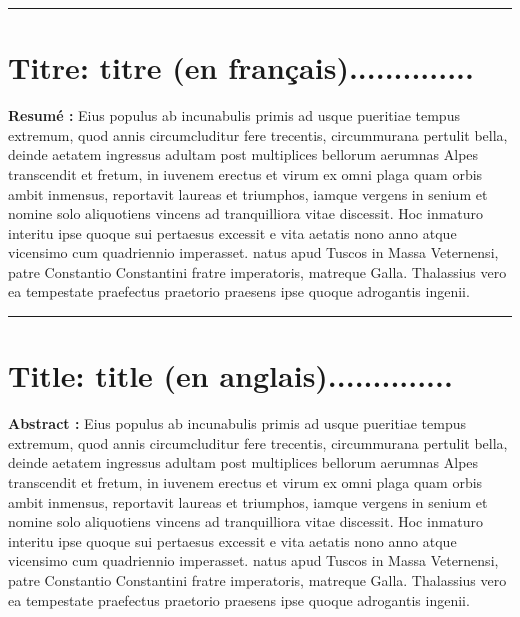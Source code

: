\par\nobreak
\hspace{- 1.75cm}\noindent \textcolor{mathSTIC-Color}{\rule{\textwidth }{0.2cm}}  %
\section*{\textcolor{mathSTIC-Color}{Titre}: titre (en fran\c cais)..............}
\noindent {}

  
\begin{multicols}{2}
\noindent \textbf{Resum\'{e} : }Eius populus ab incunabulis primis ad usque pueritiae tempus extremum, quod annis circumcluditur fere trecentis, circummurana pertulit bella, deinde aetatem ingressus adultam post multiplices bellorum aerumnas Alpes transcendit et fretum, in iuvenem erectus et virum ex omni plaga quam orbis ambit inmensus, reportavit laureas et triumphos, iamque vergens in senium et nomine solo aliquotiens vincens ad tranquilliora vitae discessit.
Hoc inmaturo interitu ipse quoque sui pertaesus excessit e vita aetatis nono anno atque vicensimo cum quadriennio imperasset. natus apud Tuscos in Massa Veternensi, patre Constantio Constantini fratre imperatoris, matreque Galla.
Thalassius vero ea tempestate praefectus praetorio praesens ipse quoque adrogantis ingenii. 




\end{multicols}
\hspace{- 1.75cm}\noindent \textcolor{mathSTIC-Color}{\rule{\linewidth}{0.2cm}}
\section*{\textcolor{mathSTIC-Color}{Title}: title (en anglais)..............}
\noindent {}

\begin{multicols}{2}
\noindent \textbf{Abstract : }Eius populus ab incunabulis primis ad usque pueritiae tempus extremum, quod annis circumcluditur fere trecentis, circummurana pertulit bella, deinde aetatem ingressus adultam post multiplices bellorum aerumnas Alpes transcendit et fretum, in iuvenem erectus et virum ex omni plaga quam orbis ambit inmensus, reportavit laureas et triumphos, iamque vergens in senium et nomine solo aliquotiens vincens ad tranquilliora vitae discessit.
Hoc inmaturo interitu ipse quoque sui pertaesus excessit e vita aetatis nono anno atque vicensimo cum quadriennio imperasset. natus apud Tuscos in Massa Veternensi, patre Constantio Constantini fratre imperatoris, matreque Galla.	Thalassius vero ea tempestate praefectus praetorio praesens ipse quoque adrogantis ingenii.
\end{multicols}


